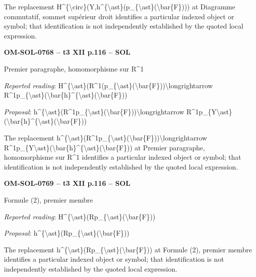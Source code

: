 The replacement H\textasciicircum{}\{\textbackslash{}circ\}(Y,h\textasciicircum{}\{\textbackslash{}ast\}(p\_\{\textbackslash{}ast\}(\textbackslash{}bar\{F\}))) at Diagramme commutatif, sommet supérieur droit identifies a particular indexed object or symbol; that identification is not independently established by the quoted local expression.\par
\par\noindent\textbf{OM-SOL-0768 -- t3 XII p.116 -- SOL}\par
Premier paragraphe, homomorphisme sur R\textasciicircum{}1\par
\emph{Reported reading}: H\textasciicircum{}\{\textbackslash{}ast\}(R\textasciicircum{}1(p\_\{\textbackslash{}ast\}(\textbackslash{}bar\{F\}))\textbackslash{}longrightarrow R\textasciicircum{}1p\_\{\textbackslash{}ast\}(\textbackslash{}bar\{h\}\textasciicircum{}\{\textbackslash{}ast\}(\textbackslash{}bar\{F\}))\par
\emph{Proposal}: h\textasciicircum{}\{\textbackslash{}ast\}(R\textasciicircum{}1p\_\{\textbackslash{}ast\}(\textbackslash{}bar\{F\}))\textbackslash{}longrightarrow R\textasciicircum{}1p\_\{Y\textbackslash{}ast\}(\textbackslash{}bar\{h\}\textasciicircum{}\{\textbackslash{}ast\}(\textbackslash{}bar\{F\}))\par
The replacement h\textasciicircum{}\{\textbackslash{}ast\}(R\textasciicircum{}1p\_\{\textbackslash{}ast\}(\textbackslash{}bar\{F\}))\textbackslash{}longrightarrow R\textasciicircum{}1p\_\{Y\textbackslash{}ast\}(\textbackslash{}bar\{h\}\textasciicircum{}\{\textbackslash{}ast\}(\textbackslash{}bar\{F\})) at Premier paragraphe, homomorphisme sur R\textasciicircum{}1 identifies a particular indexed object or symbol; that identification is not independently established by the quoted local expression.\par
\par\noindent\textbf{OM-SOL-0769 -- t3 XII p.116 -- SOL}\par
Formule (2), premier membre\par
\emph{Reported reading}: H\textasciicircum{}\{\textbackslash{}ast\}(Rp\_\{\textbackslash{}ast\}(\textbackslash{}bar\{F\}))\par
\emph{Proposal}: h\textasciicircum{}\{\textbackslash{}ast\}(Rp\_\{\textbackslash{}ast\}(\textbackslash{}bar\{F\}))\par
The replacement h\textasciicircum{}\{\textbackslash{}ast\}(Rp\_\{\textbackslash{}ast\}(\textbackslash{}bar\{F\})) at Formule (2), premier membre identifies a particular indexed object or symbol; that identification is not independently established by the quoted local expression.\par
